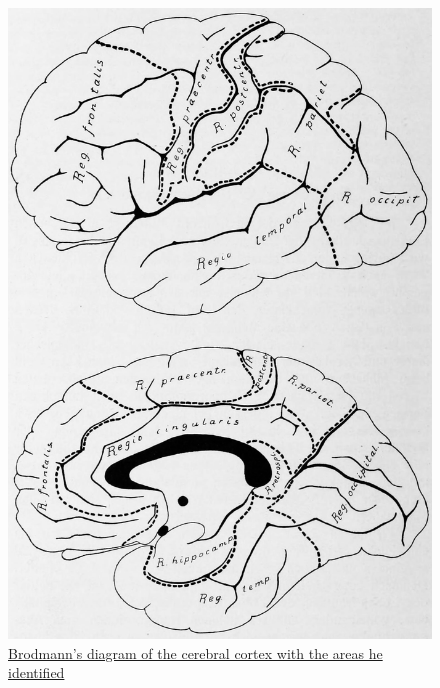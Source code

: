\begin{figure}

{\centering \includegraphics[width=0.7\linewidth]{./figures/cns/Brodmann_hauptregionen} 

}

\caption{\href{https://wellcomelibrary.org/item/b28062449}{Brodmann's diagram of the cerebral cortex with the areas he identified}}\label{fig:brodmannregions}
\end{figure}



